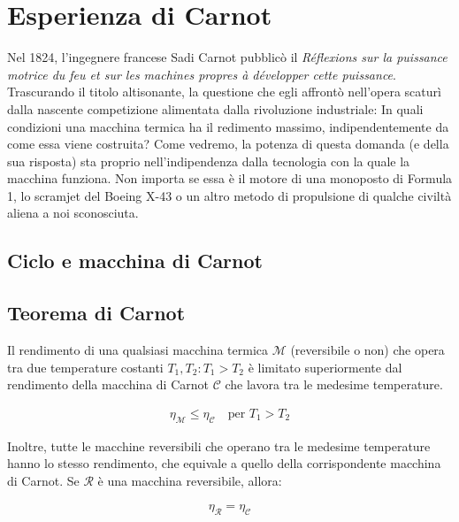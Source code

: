 \section{Esperienza di Carnot}
Nel 1824, l'ingegnere francese Sadi Carnot pubblicò il
\textit{Réflexions sur la puissance motrice du feu et sur les machines
propres à développer cette puissance}. Trascurando il titolo
altisonante, la questione che egli affrontò nell'opera
scaturì dalla nascente competizione alimentata dalla rivoluzione industriale:
In quali condizioni una macchina termica ha il redimento
massimo, indipendentemente da come essa viene costruita? Come
vedremo, la potenza di questa domanda (e della sua risposta) sta
proprio nell'indipendenza dalla tecnologia con la quale la
macchina funziona. Non importa se essa è il motore di una monoposto
di Formula 1, lo scramjet del Boeing X-43 o un altro metodo di
propulsione di qualche civiltà aliena a noi sconosciuta.

\subsection{Ciclo e macchina di Carnot}

\subsection{Teorema di Carnot}

\begin{tcolorbox}[colback = red!30, colframe = red!30!black, title = {Teorema di Carnot}]
Il rendimento di una qualsiasi macchina termica $\mathcal{M}$ (reversibile o non)
che opera tra due
temperature costanti $T_1,T_2: T_1 > T_2$ è limitato superiormente dal rendimento della
macchina di Carnot $\mathcal{C}$ che lavora tra le medesime temperature.

\begin{align}
    \eta_\mathcal{M} \leq \eta_\mathcal{C} \quad \text{per } T_1 > T_2\label{carnot1}
\end{align}

Inoltre, tutte le macchine reversibili che operano tra le medesime temperature
hanno lo stesso rendimento, che equivale a quello della corrispondente macchina di
Carnot. Se $\mathcal{R}$ è una macchina reversibile, allora:

\begin{align}
    \eta_\mathcal{R} = \eta_\mathcal{C}\label{carnot2}
\end{align}

\end{tcolorbox}

